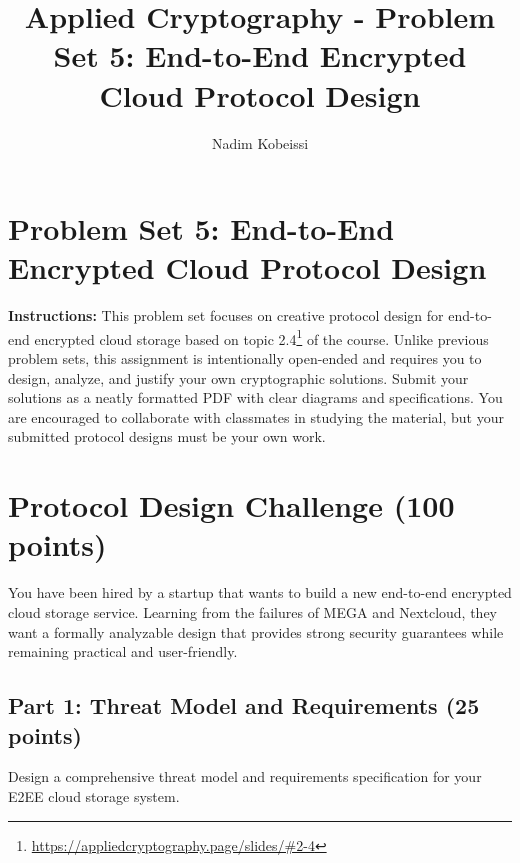 \documentclass[10pt,a4paper,american]{article}
\title{Applied Cryptography - Problem Set 5: End-to-End Encrypted Cloud Protocol Design}
\author{Nadim Kobeissi}
\begin{document}
\classhandoutheader
\section*{Problem Set 5: End-to-End Encrypted Cloud Protocol Design}

\begin{tcolorbox}[colframe=OliveGreen!30!white,colback=OliveGreen!5!white]
	\textbf{Instructions:} This problem set focuses on creative protocol design for end-to-end encrypted cloud storage based on topic 2.4\footnote{\url{https://appliedcryptography.page/slides/\#2-4}} of the course. Unlike previous problem sets, this assignment is intentionally open-ended and requires you to design, analyze, and justify your own cryptographic solutions. Submit your solutions as a neatly formatted PDF with clear diagrams and specifications. You are encouraged to collaborate with classmates in studying the material, but your submitted protocol designs must be your own work.
\end{tcolorbox}

\section{Protocol Design Challenge (100 points)}

You have been hired by a startup that wants to build a new end-to-end encrypted cloud storage service. Learning from the failures of MEGA and Nextcloud, they want a formally analyzable design that provides strong security guarantees while remaining practical and user-friendly.

\subsection{Part 1: Threat Model and Requirements (25 points)}

Design a comprehensive threat model and requirements specification for your E2EE cloud storage system.
\end{document}
